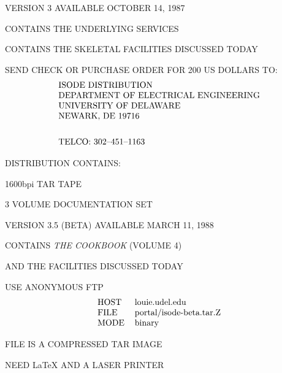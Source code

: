 \begin{bwslide}

\begin{nrtc}
\item	VERSION 3 AVAILABLE OCTOBER 14, 1987
    \begin{nrtc}
    \item	CONTAINS THE UNDERLYING SERVICES

    \item	CONTAINS THE SKELETAL FACILITIES DISCUSSED TODAY
    \end{nrtc}

\item	SEND CHECK OR PURCHASE ORDER FOR 200 US DOLLARS TO:
    \[\begin{tabular}{l}
	ISODE DISTRIBUTION\\
	DEPARTMENT OF ELECTRICAL ENGINEERING\\
	UNIVERSITY OF DELAWARE\\
	NEWARK, DE  19716\\[0.25in]
	TELCO: 302--451--1163
    \end{tabular}\]

\item	DISTRIBUTION CONTAINS:
    \begin{nrtc}
    \item	1600bpi TAR TAPE

    \item	3 VOLUME DOCUMENTATION SET
    \end{nrtc}
\end{nrtc}
\end{bwslide}


\begin{bwslide}

\begin{nrtc}
\item	VERSION 3.5 (BETA) AVAILABLE MARCH 11, 1988
    \begin{nrtc}
    \item	CONTAINS \emph{THE COOKBOOK} (VOLUME 4)

    \item	AND THE FACILITIES DISCUSSED TODAY
    \end{nrtc}

\item	USE ANONYMOUS FTP
    \[\begin{tabular}{ll}
	HOST&	louie.udel.edu\\
	FILE&	portal/isode-beta.tar.Z\\
	MODE&	binary
    \end{tabular}\]

\item	FILE IS A COMPRESSED TAR IMAGE

\item	NEED \LaTeX{} AND A LASER PRINTER
\end{nrtc}
\end{bwslide}


